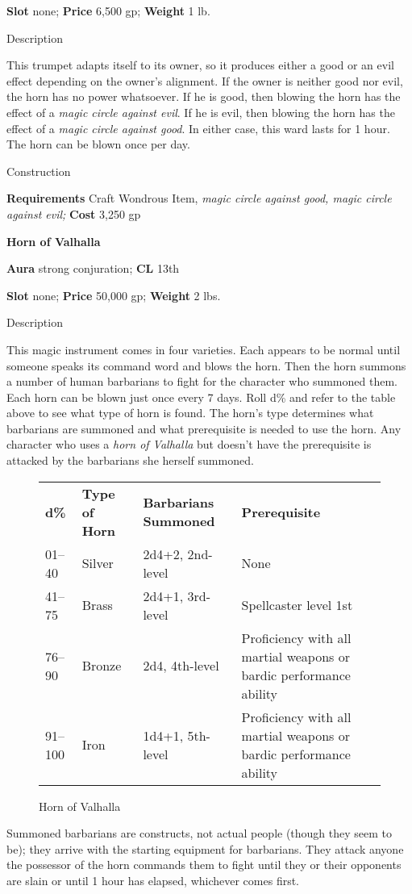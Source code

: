 \textbf{Slot} none; \textbf{Price} 6,500 gp; \textbf{Weight} 1 lb.
				
Description
				
This trumpet adapts itself to its owner, so it produces either a good or an evil effect depending on the owner's alignment. If the owner is neither good nor evil, the horn has no power whatsoever. If he is good, then blowing the horn has the effect of a \textit{magic circle against evil}. If he is evil, then blowing the horn has the effect of a \textit{magic circle against good}. In either case, this ward lasts for 1 hour. The horn can be blown once per day. 
				
Construction
				
\textbf{Requirements} Craft Wondrous Item,\textit{ magic circle against good, magic circle against evil;}\textbf{ Cost }3,250 gp
				
\textbf{Horn of Valhalla}
				
\textbf{Aura} strong conjuration;\textbf{ CL }13th
				
\textbf{Slot} none; \textbf{Price} 50,000 gp; \textbf{Weight} 2 lbs.
				
Description
				
This magic instrument comes in four varieties. Each appears to be normal until someone speaks its command word and blows the horn. Then the horn summons a number of human barbarians to fight for the character who summoned them. Each horn can be blown just once every 7 days. Roll d\% and refer to the table above to see what type of horn is found. The horn's type determines what barbarians are summoned and what prerequisite is needed to use the horn. Any character who uses a \textit{horn of Valhalla} but doesn't have the prerequisite is attacked by the barbarians she herself summoned.

\begin{figure*}
\caption{Horn of Valhalla}  %
\sffamily
\begin{tabular}{llll}
\textbf{d\%} & \textbf{Type of Horn} & \textbf{Barbarians Summoned} & \textbf{Prerequisite}                                              \\
01--40        & Silver                & 2d4+2, 2nd-level             & None                                                               \\
41--75        & Brass                 & 2d4+1, 3rd-level             & Spellcaster level 1st                                              \\
76--90        & Bronze                & 2d4, 4th-level               & Proficiency with all martial weapons or bardic performance ability \\
91--100       & Iron                  & 1d4+1, 5th-level             & Proficiency with all martial weapons or bardic performance ability
\end{tabular}
\end{figure*}
Summoned barbarians are constructs, not actual people (though they seem to be); they arrive with the starting equipment for barbarians. They attack anyone the possessor of the horn commands them to fight until they or their opponents are slain or until 1 hour has elapsed, whichever comes first. 
				
